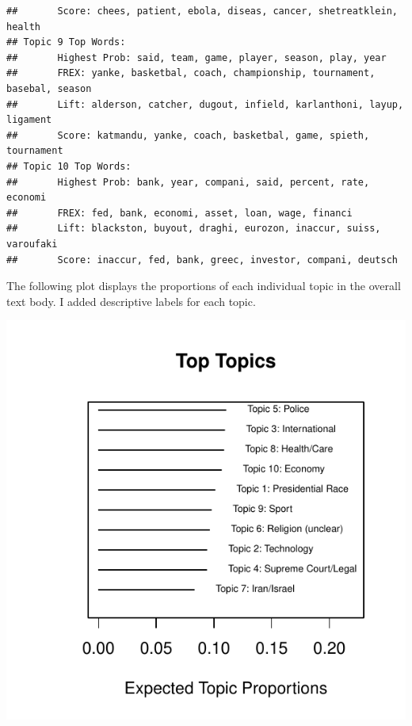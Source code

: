 \documentclass[12pt]{article}\usepackage[]{graphicx}\usepackage[]{color}
\makeatletter
\def\maxwidth{ %
  \ifdim\Gin@nat@width>\linewidth
    \linewidth
  \else
    \Gin@nat@width
  \fi
}
\newenvironment{kframe}{%
 \def\at@end@of@kframe{}%
 \ifinner\ifhmode%
  \def\at@end@of@kframe{\end{minipage}}%
  \begin{minipage}{\columnwidth}%
 \fi\fi%
 \def\FrameCommand##1{\hskip\@totalleftmargin \hskip-\fboxsep
 \colorbox{shadecolor}{##1}\hskip-\fboxsep
     \hskip-\linewidth \hskip-\@totalleftmargin \hskip\columnwidth}%
 \MakeFramed {\advance\hsize-\width
   \@totalleftmargin\z@ \linewidth\hsize
   \@setminipage}}%
 {\par\unskip\endMakeFramed%
 \at@end@of@kframe}
\newenvironment{knitrout}{}{} %
\makeatother
\begin{document}
\begin{knitrout}
\begin{kframe}
\begin{verbatim}
##  	 Score: chees, patient, ebola, diseas, cancer, shetreatklein, health 
## Topic 9 Top Words:
##  	 Highest Prob: said, team, game, player, season, play, year 
##  	 FREX: yanke, basketbal, coach, championship, tournament, basebal, season 
##  	 Lift: alderson, catcher, dugout, infield, karlanthoni, layup, ligament 
##  	 Score: katmandu, yanke, coach, basketbal, game, spieth, tournament 
## Topic 10 Top Words:
##  	 Highest Prob: bank, year, compani, said, percent, rate, economi 
##  	 FREX: fed, bank, economi, asset, loan, wage, financi 
##  	 Lift: blackston, buyout, draghi, eurozon, inaccur, suiss, varoufaki 
##  	 Score: inaccur, fed, bank, greec, investor, compani, deutsch
\end{verbatim}
\end{kframe}
\end{knitrout}

The following plot displays the proportions of each individual topic in the overall text body. I added descriptive labels for each topic.

\begin{knitrout}
\color{fgcolor}
\includegraphics[width=\maxwidth]{figure/unnamed-chunk-5-1} 

\end{knitrout}
\end{document}
